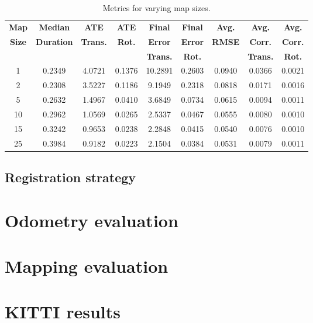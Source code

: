 \begin{table}[h]
    \centering
    \begin{tabular}{ccccccccc}
        \hline
        \textbf{Map}  & \textbf{Median}   & \textbf{ATE}    & \textbf{ATE}  & \textbf{Final } & \textbf{Final} & \textbf{Avg.} & \textbf{Avg.}   & \textbf{Avg.}  \\
        \textbf{Size} & \textbf{Duration} & \textbf{Trans.} & \textbf{Rot.} & \textbf{Error}  & \textbf{Error} & \textbf{RMSE} & \textbf{Corr.}  & \textbf{Corr.} \\
                      &                   & \textbf{}       & \textbf{}     & \textbf{Trans.} & \textbf{Rot.}  & \textbf{}     & \textbf{Trans.} & \textbf{Rot.}  \\
        \hline \hline
        1             & 0.2349            & 4.0721          & 0.1376        & 10.2891         & 0.2603         & 0.0940        & 0.0366          & 0.0021         \\
        2             & 0.2308            & 3.5227          & 0.1186        & 9.1949          & 0.2318         & 0.0818        & 0.0171          & 0.0016         \\
        5             & 0.2632            & 1.4967          & 0.0410        & 3.6849          & 0.0734         & 0.0615        & 0.0094          & 0.0011         \\
        10            & 0.2962            & 1.0569          & 0.0265        & 2.5337          & 0.0467         & 0.0555        & 0.0080          & 0.0010         \\
        15            & 0.3242            & 0.9653          & 0.0238        & 2.2848          & 0.0415         & 0.0540        & 0.0076          & 0.0010         \\
        25            & 0.3984            & 0.9182          & 0.0223        & 2.1504          & 0.0384         & 0.0531        & 0.0079          & 0.0011         \\
        \hline
    \end{tabular}
    \caption{Metrics for varying map sizes.}
    \label{tab:map_sizes}
\end{table}

\subsection{Registration strategy}


\section{Odometry evaluation}

\section{Mapping evaluation}

\section{KITTI results}


